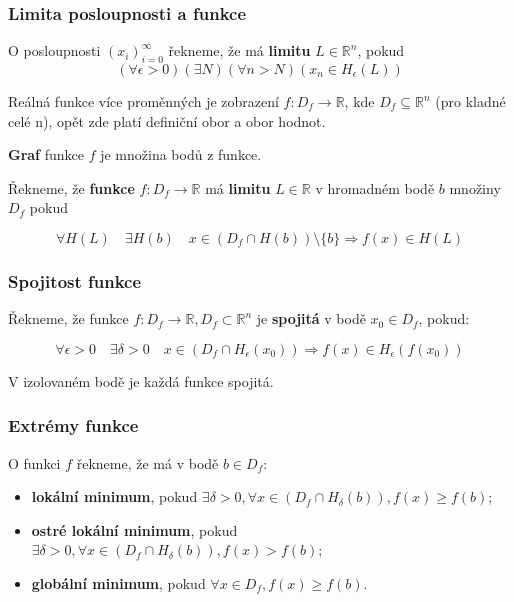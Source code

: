 \subsubsection{Limita posloupnosti a funkce}

O posloupnosti $(x_i)_{i=0}^{\infty}$ řekneme, že má \textbf{limitu} $L \in \mathbb{R}^n$, pokud
\begin{equation}
    (\forall \epsilon > 0)(\exists N)(\forall n > N)(x_n \in H_{\epsilon}(L))
\end{equation}

\noindent Reálná funkce více proměnných je zobrazení $f: D_f \to \mathbb{R}$, kde $D_f \subseteq \mathbb{R}^n$ (pro kladné celé n), opět zde platí definiční obor a obor hodnot.

\vspace{4pt} \noindent \textbf{Graf} funkce $f$ je množina bodů z funkce.

\vspace{4pt} \noindent Řekneme, že \textbf{funkce} $f: D_f \to \mathbb{R}$ má \textbf{limitu} $L \in \mathbb{R}$ v hromadném bodě $b$ množiny $D_f$ pokud

\begin{equation}
    \forall H(L) \quad \exists H(b) \quad x \in (D_f \cap H(b)) \setminus \{b\} \Longrightarrow f(x) \in H(L)
\end{equation}

\subsubsection{Spojitost funkce}

Řekneme, že funkce $f: D_f \to \mathbb{R}, D_f \subset \mathbb{R}^n$ je \textbf{spojitá} v bodě $x_0 \in D_f$, pokud:

\begin{equation}
    \forall \epsilon > 0 \quad \exists \delta > 0 \quad x \in (D_f \cap H_\epsilon(x_0)) \Longrightarrow f(x) \in H_\epsilon(f(x_0))
\end{equation}

\noindent V izolovaném bodě je každá funkce spojitá.

\subsubsection{Extrémy funkce}

O funkci $f$ řekneme, že má v bodě $b \in D_f$:

\begin{itemize}
    \item \textbf{lokální minimum}, pokud $\exists \delta > 0, \forall x \in (D_f \cap H_\delta(b)), f(x) \geq f(b)$;
    \item \textbf{ostré lokální minimum}, pokud $\exists \delta > 0, \forall x \in (D_f \cap H_\delta(b)), f(x) > f(b)$;
    \item \textbf{globální minimum}, pokud $\forall x \in D_f, f(x) \geq f(b)$.
\end{itemize}

